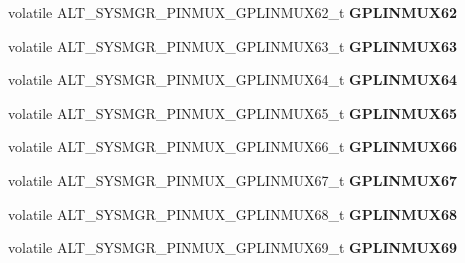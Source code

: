 \begin{DoxyCompactItemize}
volatile A\+L\+T\+\_\+\+S\+Y\+S\+M\+G\+R\+\_\+\+P\+I\+N\+M\+U\+X\+\_\+\+G\+P\+L\+I\+N\+M\+U\+X62\+\_\+t {\bfseries G\+P\+L\+I\+N\+M\+U\+X62}
\item 
\mbox{\label{structALT__SYSMGR__PINMUX__s_a97f8522c1e8576026b459e1608960d55}} 
volatile A\+L\+T\+\_\+\+S\+Y\+S\+M\+G\+R\+\_\+\+P\+I\+N\+M\+U\+X\+\_\+\+G\+P\+L\+I\+N\+M\+U\+X63\+\_\+t {\bfseries G\+P\+L\+I\+N\+M\+U\+X63}
\item 
\mbox{\label{structALT__SYSMGR__PINMUX__s_a338e4af7c7e1e3c096bec11721d810a6}} 
volatile A\+L\+T\+\_\+\+S\+Y\+S\+M\+G\+R\+\_\+\+P\+I\+N\+M\+U\+X\+\_\+\+G\+P\+L\+I\+N\+M\+U\+X64\+\_\+t {\bfseries G\+P\+L\+I\+N\+M\+U\+X64}
\item 
\mbox{\label{structALT__SYSMGR__PINMUX__s_a3cd259ca21560204acc800b40dd3a346}} 
volatile A\+L\+T\+\_\+\+S\+Y\+S\+M\+G\+R\+\_\+\+P\+I\+N\+M\+U\+X\+\_\+\+G\+P\+L\+I\+N\+M\+U\+X65\+\_\+t {\bfseries G\+P\+L\+I\+N\+M\+U\+X65}
\item 
\mbox{\label{structALT__SYSMGR__PINMUX__s_a0c637833e6d5b12838c9b93f7eb93542}} 
volatile A\+L\+T\+\_\+\+S\+Y\+S\+M\+G\+R\+\_\+\+P\+I\+N\+M\+U\+X\+\_\+\+G\+P\+L\+I\+N\+M\+U\+X66\+\_\+t {\bfseries G\+P\+L\+I\+N\+M\+U\+X66}
\item 
\mbox{\label{structALT__SYSMGR__PINMUX__s_aa7d71b4cffdbc52558096231e90050cd}} 
volatile A\+L\+T\+\_\+\+S\+Y\+S\+M\+G\+R\+\_\+\+P\+I\+N\+M\+U\+X\+\_\+\+G\+P\+L\+I\+N\+M\+U\+X67\+\_\+t {\bfseries G\+P\+L\+I\+N\+M\+U\+X67}
\item 
\mbox{\label{structALT__SYSMGR__PINMUX__s_a854841686f7dfe3491780db785f59442}} 
volatile A\+L\+T\+\_\+\+S\+Y\+S\+M\+G\+R\+\_\+\+P\+I\+N\+M\+U\+X\+\_\+\+G\+P\+L\+I\+N\+M\+U\+X68\+\_\+t {\bfseries G\+P\+L\+I\+N\+M\+U\+X68}
\item 
\mbox{\label{structALT__SYSMGR__PINMUX__s_a773de6bbd46c1b595d64dc44ea4b86e9}} 
volatile A\+L\+T\+\_\+\+S\+Y\+S\+M\+G\+R\+\_\+\+P\+I\+N\+M\+U\+X\+\_\+\+G\+P\+L\+I\+N\+M\+U\+X69\+\_\+t {\bfseries G\+P\+L\+I\+N\+M\+U\+X69}
\item 
\mbox{\label{structALT__SYSMGR__PINMUX__s_a88d3cf0077ac451b83fd1c65b79aeb6d}} 

\end{DoxyCompactItemize}
